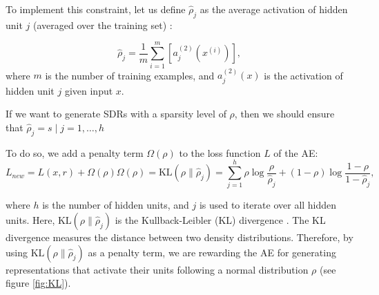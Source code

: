 \documentclass{article}
\begin{document}
To implement this constraint, let us define $\hat{\rho}_{j}$ as the average activation of hidden unit $j$ (averaged over the training set) \cite{ng2011sparse}:

\begin{equation}
    \hat{\rho}_{j}=\frac{1}{m} \sum_{i=1}^{m}\left[a_{j}^{(2)}\left(x^{(i)}\right)\right],
\end{equation}
where $m$ is the number of training examples, and $a_{j}^{(2)}\left(x\right)$ is the activation of hidden unit $j$ given input $x$.

If we want to generate SDRs with a sparsity level of $\rho$, then we should ensure that $\hat\rho_{j}=s \mid j=1, \dots,h$

To do so, we add a penalty term $\Omega(\rho)$ to the loss function $L$ of the AE:
\begin{subequations}
    \begin{equation}
        L_{new} = L(x,r) + \Omega(\rho)
    \end{equation}
    
    \begin{equation}
    \label{eqn:KLdiv}
        \Omega(\rho) = \mathrm{KL}\left(\rho \| \hat{\rho}_{j}\right) =  \sum_{j=1}^{h} \rho \log \frac{\rho}{\hat{\rho}_{j}}+(1-\rho) \log \frac{1-\rho}{1-\hat{\rho}_{j}},
    \end{equation}
\end{subequations}

where $h$ is the number of hidden units, and $j$ is used to iterate over all hidden units. Here, $\mathrm{KL}\left(\rho \| \hat{\rho}_{j}\right)$ is the  Kullback-Leibler (KL) divergence \cite{kullback1951information}. The KL divergence measures the distance between two density distributions. Therefore, by using $\mathrm{KL}\left(\rho \| \hat{\rho}_{j}\right)$ as a penalty term, we are rewarding the AE for generating representations that activate their units following a normal distribution $\rho$ (see figure \ref{fig:KL}).
\end{document}
